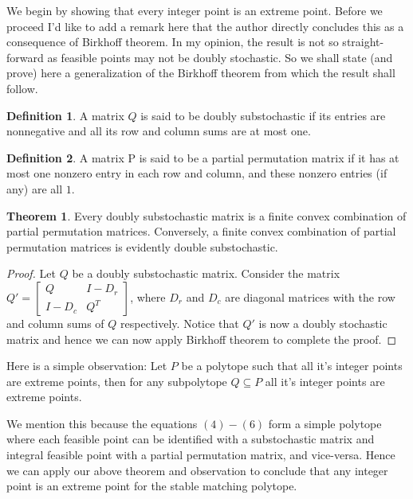 \documentclass[a4paper,UKenglish,cleveref, autoref]{lipics-v2019}
\theoremstyle{definition}
\newtheorem*{definition*}{Definition}
\newtheorem*{theorem*}{Theorem}
\begin{document}

We begin by showing that every integer point is an extreme point. Before we proceed I'd like to add a remark here that the author directly concludes this as a consequence of Birkhoff theorem. In my opinion, the result is not so straight-forward as feasible points may not be doubly stochastic. So we shall state (and prove) here a generalization of the Birkhoff theorem from which the result shall follow.

\begin{definition*}
A matrix $Q$ is said to be doubly substochastic if its entries are nonnegative and all its row and column sums are at most one.
\end{definition*}
\begin{definition*}
A matrix P is said to be a partial permutation matrix if it has at most one nonzero entry in each row and column, and these nonzero entries (if any) are all $1$.
\end{definition*}
\begin{theorem*}
Every doubly substochastic matrix is a finite convex combination of partial permutation matrices. Conversely, a finite convex combination of partial permutation matrices is evidently double substochastic.
\end{theorem*}
\begin{proof}
Let $Q$ be a doubly substochastic matrix. Consider the matrix $Q' = \begin{bmatrix} Q & I-D_r\\I-D_c & Q^T\end{bmatrix}$, where $D_r$ and $D_c$ are diagonal matrices with the row and column sums of $Q$ respectively. Notice that $Q'$ is now a doubly stochastic matrix and hence we can now apply Birkhoff theorem to complete the proof.
\end{proof}

Here is a simple observation: Let $P$ be a polytope such that all it's integer points are extreme points, then for any subpolytope $Q \subseteq P$ all it's integer points are extreme points.

We mention this because the equations $(4)-(6)$ form a simple polytope where each feasible point can be identified with a substochastic matrix and integral feasible point with a partial permutation matrix, and vice-versa. Hence we can apply our above theorem and observation to conclude that any integer point is an extreme point for the stable matching polytope.
\newline 
\end{document}
